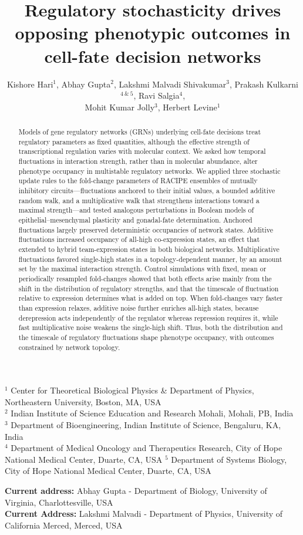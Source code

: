 \documentclass[11pt]{article}
\title{Regulatory stochasticity drives opposing phenotypic outcomes in cell-fate decision networks}
\author{Kishore Hari$^1$, Abhay Gupta$^2$, Lakshmi Malvadi Shivakumar$^3$, Prakash Kulkarni$^{4~\&~5}$, Ravi Salgia$^4$, \\ Mohit Kumar Jolly$^3$, Herbert Levine$^1$}
\begin{document}
\maketitle
\begin{center}
    $^1$ Center for Theoretical Biological Physics \& Department of Physics, Northeastern University, Boston, MA, USA\\
    $^2$ Indian Institute of Science Education and Research Mohali, Mohali, PB, India\\
    $^3$ Department of Bioengineering, Indian Institute of Science, Bengaluru, KA, India \\
    $^4$ Department of Medical Oncology and Therapeutics Research, City of Hope National Medical Center, Duarte, CA, USA
    $^5$ Department of Systems Biology, City of Hope National Medical Center, Duarte, CA, USA 
\end{center}
\begin{center}
    \small \textbf{Current address:} Abhay Gupta - Department of Biology, University of Virginia, Charlottesville, USA\\
    \small \textbf{Current Address:} Lakshmi Malvadi - Department of Physics, University of California Merced, Merced, USA\\
\end{center}
\begin{abstract}
Models of gene regulatory networks (GRNs) underlying cell-fate decisions treat regulatory parameters as fixed quantities, although the effective strength of transcriptional regulation varies with molecular context. We asked how temporal fluctuations in interaction strength, rather than in molecular abundance, alter phenotype occupancy in multistable regulatory networks. We applied three stochastic update rules to the fold-change parameters of RACIPE ensembles of mutually inhibitory circuits---fluctuations anchored to their initial values, a bounded additive random walk, and a multiplicative walk that strengthens interactions toward a maximal strength---and tested analogous perturbations in Boolean models of epithelial--mesenchymal plasticity and gonadal-fate determination. Anchored fluctuations largely preserved deterministic occupancies of network states. Additive fluctuations increased occupancy of all-high co-expression states, an effect that extended to hybrid team-expression states in both biological networks. Multiplicative fluctuations favored single-high states in a topology-dependent manner, by an amount set by the maximal interaction strength. Control simulations with fixed, mean or periodically resampled fold-changes showed that both effects arise mainly from the shift in the distribution of regulatory strengths, and that the timescale of fluctuation relative to expression determines what is added on top. When fold-changes vary faster than expression relaxes, additive noise further enriches all-high states, because derepression acts independently of the regulator whereas repression requires it, while fast multiplicative noise weakens the single-high shift. Thus, both the distribution and the timescale of regulatory fluctuations shape phenotype occupancy, with outcomes constrained by network topology.
\end{abstract}
\end{document}
